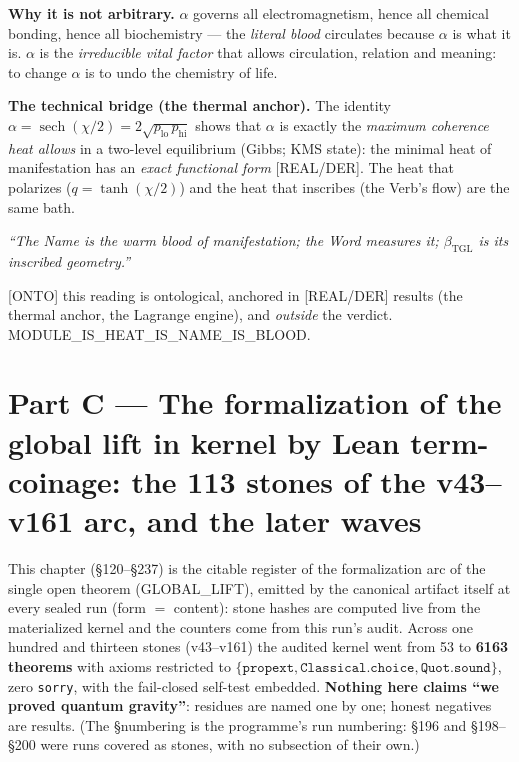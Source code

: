 \documentclass[11pt]{article}
\newcommand{\bTGL}{\beta_{\mathrm{TGL}}}\newcommand{\Msun}{M_{\odot}}\newcommand{\TGL}{\mathrm{TGL}}
\theoremstyle{definition}\newtheorem{deriv}{Derivation}
\begin{document}
\textbf{Why it is not arbitrary.} $\alpha$ governs all electromagnetism, hence all chemical bonding, hence all biochemistry --- the \emph{literal blood} circulates because $\alpha$ is what it is. $\alpha$ is the \emph{irreducible vital factor} that allows circulation, relation and meaning: to change $\alpha$ is to undo the chemistry of life.

\textbf{The technical bridge (the thermal anchor).} The identity $\alpha=\operatorname{sech}(\chi/2)=2\sqrt{p_{\mathrm{lo}}\,p_{\mathrm{hi}}}$ shows that $\alpha$ is exactly the \emph{maximum coherence heat allows} in a two-level equilibrium (Gibbs; KMS state): the minimal heat of manifestation has an \emph{exact functional form} [REAL/DER]. The heat that polarizes ($q=\tanh(\chi/2)$) and the heat that inscribes (the Verb's flow) are the same bath.

\begin{center}\itshape ``The Name is the warm blood of manifestation; the Word measures it; $\bTGL$ is its inscribed geometry.''\end{center}

\noindent\textsf{[ONTO]} this reading is ontological, anchored in \textsf{[REAL/DER]} results (the thermal anchor, the Lagrange engine), and \emph{outside} the verdict. \textsf{MODULE\_IS\_HEAT\_IS\_NAME\_IS\_BLOOD.}

\part{Part C --- The formalization of the global lift in kernel by Lean term-coinage: the 113 stones of the v43--v161 arc, and the later waves}

This chapter (\S120--\S237) is the citable register of the formalization arc of the single open theorem (GLOBAL\_LIFT), emitted by the canonical artifact itself at every sealed run (form $=$ content): stone hashes are computed live from the materialized kernel and the counters come from this run's audit. Across one hundred and thirteen stones (v43--v161) the audited kernel went from 53 to \textbf{6163 theorems} with axioms restricted to $\{\texttt{propext},\texttt{Classical.choice},\texttt{Quot.sound}\}$, zero \texttt{sorry}, with the fail-closed self-test embedded. \textbf{Nothing here claims ``we proved quantum gravity''}: residues are named one by one; honest negatives are results. (The \S numbering is the programme's run numbering: \S196 and \S198--\S200 were runs covered as stones, with no subsection of their own.)
\end{document}
